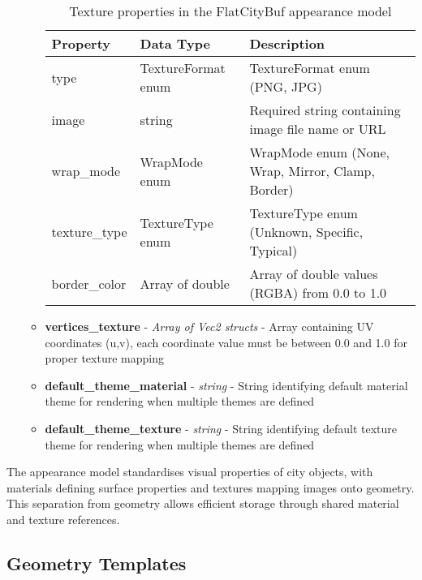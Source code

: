 \begin{itemize}
\begin{itemize}
        \begin{table}[h]
          \centering
          \caption{Texture properties in the FlatCityBuf appearance model}
          \label{tab:texture_properties}
          \begin{tabular}{@{}lll@{}}
            \toprule
            \textbf{Property} & \textbf{Data Type} & \textbf{Description} \\
            \midrule
            type & TextureFormat enum & TextureFormat enum (PNG, JPG) \\
            image & string & Required string containing image file name or URL \\
            wrap\_mode & WrapMode enum & WrapMode enum (None, Wrap, Mirror, Clamp, Border) \\
            texture\_type & TextureType enum & TextureType enum (Unknown, Specific, Typical) \\
            border\_color & Array of double & Array of double values (RGBA) from 0.0 to 1.0 \\
            \bottomrule
          \end{tabular}
        \end{table}

      \item \textbf{vertices\_texture} - \textit{Array of Vec2 structs} - Array containing UV coordinates (u,v), each coordinate value must be between 0.0 and 1.0 for proper texture mapping

      \item \textbf{default\_theme\_material} - \textit{string} - String identifying default material theme for rendering when multiple themes are defined
      \item \textbf{default\_theme\_texture} - \textit{string} - String identifying default texture theme for rendering when multiple themes are defined
    \end{itemize}
\end{itemize}

The appearance model standardises visual properties of city objects, with materials defining surface properties and textures mapping images onto geometry. This separation from geometry allows efficient storage through shared material and texture references.

\subsection{Geometry Templates}
\label{methodology:header:geometry_templates}

